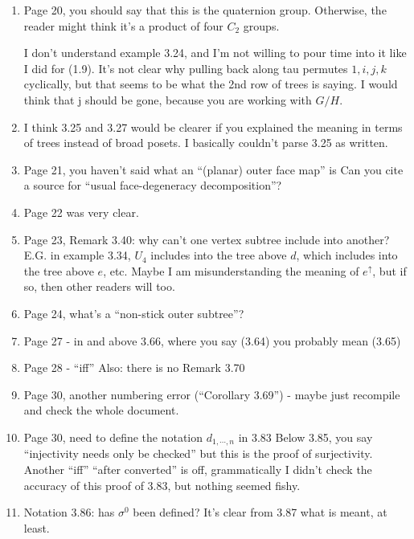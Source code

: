 \documentclass{article}
\begin{document}
\begin{enumerate}
\item
Page 20, you should say that this is the quaternion group. Otherwise, the reader might think it's a product of four $C_2$ groups.

I don't understand example 3.24, and I'm not willing to pour time into it like I did for (1.9). It's not clear why pulling back along tau permutes $1,i,j,k$ cyclically, but that seems to be what the 2nd row of trees is saying. I would think that j should be gone, because you are working with $G/H$.


\item
I think 3.25 and 3.27 would be clearer if you explained the meaning in terms of trees instead of broad posets. I basically couldn't parse 3.25 as written. 

\item
Page 21, you haven't said what an ``(planar) outer face map'' is
Can you cite a source for ``usual face-degeneracy decomposition''?

\item
Page 22 was very clear.

\item
Page 23, Remark 3.40: why can't one vertex subtree include into another? E.G. in example 3.34, $U_4$ includes into the tree above $d$, which includes into the tree above $e$, etc. Maybe I am misunderstanding the meaning of $e^\uparrow$, but if so, then other readers will too.


\item
Page 24, what's a ``non-stick outer subtree''?

\item
Page 27 - in and above 3.66, where you say (3.64) you probably mean (3.65)

\item
Page 28 - ``iff''
Also: there is no Remark 3.70

\item
Page 30, another numbering error (``Corollary 3.69'') - maybe just recompile and check the whole document.

\item
Page 30, need to define the notation $d_{1,\cdots,n}$ in 3.83
Below 3.85, you say ``injectivity needs only be checked'' but this is the proof of surjectivity.
Another ``iff''
``after converted'' is off, grammatically
I didn't check the accuracy of this proof of 3.83, but nothing seemed fishy.

\item
Notation 3.86: has $\sigma^0$ been defined?
It's clear from 3.87 what is meant, at least.


\end{enumerate}
\end{document}
